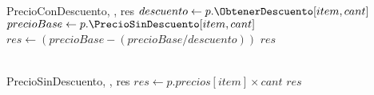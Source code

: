 \documentclass[../main.tex]{subfiles}
\begin{document}
\begin{algoritmos}
\begin{implementacion}{PrecioConDescuento}{, , }{res}{\dinero}
\State $descuento \gets p.\ObtenerDescuento[item, cant]$ %
\State $precioBase \gets p.\PrecioSinDescuento[item, cant]$ %
\State $res \gets (precioBase - (precioBase / descuento))$  
\State \Return $res$
\\
 \\
\end{implementacion}

\begin{implementacion}{PrecioSinDescuento}{, , }{res}{\dinero}
\State $res \gets p.precios[item] \times cant$ %
\State \Return $res$

 \\
\end{implementacion}


\end{algoritmos} \newpage
\end{document}
